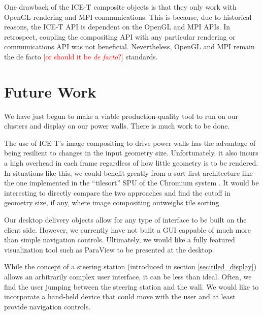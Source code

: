 \documentclass[twocolumn]{article}
\newcommand{\sticky}[1]{\textcolor{Red}{[#1]}}
\begin{document}
One drawback of the ICE-T composite objects is that they only work with
OpenGL rendering and MPI communications.  This is because, due to
historical reasons, the ICE-T API is dependent on the OpenGL and MPI APIs.
In retrospect, coupling the compositing API with any particular rendering
or communications API was not beneficial.  Nevertheless, OpenGL and MPI
remain the de facto \sticky{or should it be \emph{de facto}?} standards.


\section{Future Work}
\label{sec:future_work}

We have just begun to make a viable production-quality tool to run on our
clusters and display on our power walls.  There is much work to be done.

The use of ICE-T's image compositing to drive power walls has the advantage
of being resilient to changes in the input geometry size.  Unfortunately,
it also incurs a high overhead in each frame regardless of how little
geometry is to be rendered.  In situations like this, we could benefit
greatly from a sort-first architecture like the one implemented in the
``tilesort'' SPU of the Chromium system \cite{Humphreys02}.  It would be
interesting to directly compare the two approaches and find the cutoff in
geometry size, if any, where image compositing outweighs tile sorting.

Our desktop delivery objects allow for any type of interface to be built on
the client side.  However, we currently have not built a GUI cappable of
much more than simple navigation controls.  Ultimately, we would like a
fully featured visualization tool such as ParaView \cite{Law01} to be
presented at the desktop.

While the concept of a steering station (introduced in section
\ref{sec:tiled_display}) allows an arbitrarily complex user interface, it
can be less than ideal.  Often, we find the user jumping between the
steering station and the wall.  We would like to incorporate a hand-held
device that could move with the user and at least provide navigation
controls.




\end{document}
